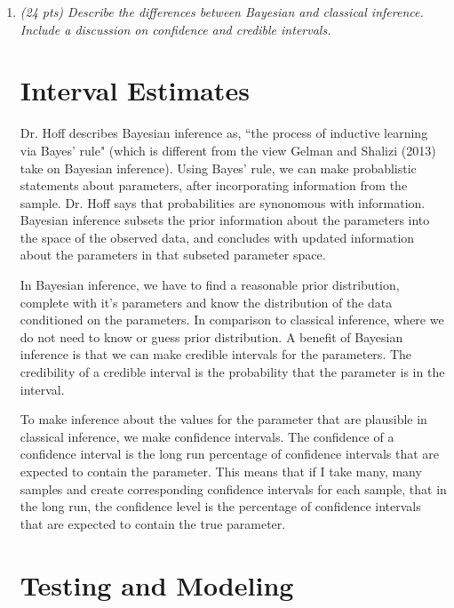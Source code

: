 \documentclass{article}\usepackage[]{graphicx}\usepackage[]{color}
\begin{document}
\begin{enumerate}
\item %
{\it (24 pts) Describe the differences between Bayesian and classical inference. Include a discussion on confidence and credible intervals.}

\section*{\small{Interval Estimates}}

Dr. Hoff describes Bayesian inference as, ``the process of inductive learning via Bayes' rule" (which is different from the view Gelman and Shalizi (2013) take on Bayesian inference). Using Bayes' rule, we can make probablistic statements about parameters, after incorporating information from the sample. Dr. Hoff says that probabilities are synonomous with information. Bayesian inference subsets the prior information about the parameters into the space of the observed data, and concludes with updated information about the parameters in that subseted parameter space.

In Bayesian inference, we have to find a reasonable prior distribution, complete with it's parameters and know the distribution of the data conditioned on the parameters. In comparison to classical inference, where we do not need to know or guess  prior distribution. A benefit of Bayesian inference is that we can make credible intervals for the parameters. The credibility of a credible interval is the probability that the parameter is in the interval.

To make inference about the values for the parameter that are plausible in classical inference, we make confidence intervals. The confidence of a confidence interval is the long run percentage of confidence intervals that are expected to contain the parameter. This means that if I take many, many samples and create corresponding confidence intervals for each sample, that in the long run, the confidence level is the percentage of confidence intervals that are expected to contain the true parameter.

\section*{\small{Testing and Modeling}}


\end{enumerate}
\end{document}
